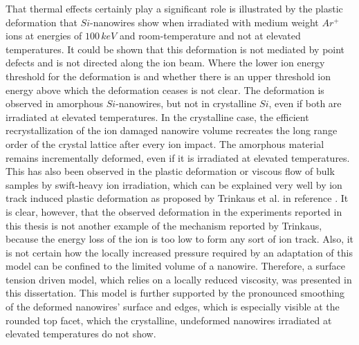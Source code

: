 That thermal effects certainly play a significant role is illustrated by the plastic deformation that $Si$-nanowires show when irradiated with medium weight $Ar^+$ ions at energies of $100\,keV$ and room-temperature and not at elevated temperatures. It could be shown that this deformation is not mediated by point defects and is not directed along the ion beam. Where the lower ion energy threshold for the deformation is and whether there is an upper threshold ion energy above which the deformation ceases is not clear. The deformation is observed in amorphous $Si$-nanowires, but not in crystalline $Si$, even if both are irradiated at elevated temperatures. In the crystalline case, the efficient recrystallization of the ion damaged nanowire volume recreates the long range order of the crystal lattice after every ion impact. The amorphous material remains incrementally deformed, even if it is irradiated at elevated temperatures. This has also been observed in the plastic deformation or viscous flow of bulk samples by swift-heavy ion irradiation, which can be explained very well by ion track induced plastic deformation as proposed by Trinkaus et al. in reference \cite{trinkaus_viscoelastic_1995}. It is clear, however, that the observed deformation in the experiments reported in this thesis is not another example of the mechanism reported by Trinkaus, because the energy loss of the ion is too low to form any sort of ion track. Also, it is not certain how the locally increased pressure required by an adaptation of this model can be confined to the limited volume of a nanowire. Therefore, a surface tension driven model, which relies on a locally reduced viscosity, was presented in this dissertation. This model is further supported by the pronounced smoothing of the deformed nanowires' surface and edges, which is especially visible at the rounded top facet, which the crystalline, undeformed nanowires irradiated at elevated temperatures do not show.

